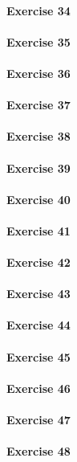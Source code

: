 \paragraph{Exercise 34}
\paragraph{Exercise 35}
\paragraph{Exercise 36}
\paragraph{Exercise 37}
\paragraph{Exercise 38}
\paragraph{Exercise 39}
\paragraph{Exercise 40}
\paragraph{Exercise 41}
\paragraph{Exercise 42}
\paragraph{Exercise 43}
\paragraph{Exercise 44}
\paragraph{Exercise 45}
\paragraph{Exercise 46}
\paragraph{Exercise 47}
\paragraph{Exercise 48}
